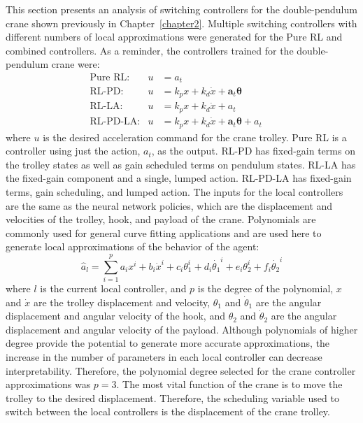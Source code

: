 This section presents an analysis of switching controllers for the double-pendulum crane shown previously in Chapter~\ref{chapter2}. Multiple switching controllers with different numbers of local approximations were generated for the Pure RL and combined controllers.
As a reminder, the controllers trained for the double-pendulum crane were:
%
\begin{align*}
&\qquad\qquad\text{Pure RL:} & u&=a_t \qquad\qquad\qquad\\
&\qquad\qquad\text{RL-PD:} & u&=k_px+k_d\dot{x} + \boldsymbol{a}_t\boldsymbol{\theta} \qquad\qquad\qquad\\
&\qquad\qquad\text{RL-LA:} & u&=k_px+k_d\dot{x} + a_t \qquad\qquad\qquad\\
&\qquad\qquad\text{RL-PD-LA:} & u&=k_px+k_d\dot{x} + \boldsymbol{a}_t\boldsymbol{\theta} + a_t \qquad\qquad\qquad
\end{align*}
%
where $u$ is the desired acceleration command for the crane trolley. Pure RL is a controller using just the action, $a_t$, as the output. RL-PD has fixed-gain terms on the trolley states as well as gain scheduled terms on pendulum states. RL-LA has the fixed-gain component and a single, lumped action. RL-PD-LA has fixed-gain terms, gain scheduling, and lumped action.
%
The inputs for the local controllers are the same as the neural network policies, which are the displacement and velocities of the trolley, hook, and payload of the crane.
Polynomials are commonly used for general curve fitting applications and are used here to generate local approximations of the behavior of the agent:
%
\begin{equation}
    \hat{a}_l=\sum_{i=1}^p a_ix^i + b_i\dot{x}^i + c_i\theta_1^i + d_i\dot{\theta_1}^i + e_i\theta_2^i + f_i\dot{\theta_2}^i
\label{eq_chap5:dpcrane_approx_func}
\end{equation}
%
where $l$ is the current local controller, and $p$ is the degree of the polynomial, $x$ and $\dot{x}$ are the trolley displacement and velocity, $\theta_1$ and $\dot{\theta}_1$ are the angular displacement and angular velocity of the hook, and $\theta_2$ and $\dot{\theta}_2$ are the angular displacement and angular velocity of the payload. Although polynomials of higher degree provide the potential to generate more accurate approximations, the increase in the number of parameters in each local controller can decrease interpretability. Therefore, the polynomial degree selected for the crane controller approximations was $p=3$.
%
The most vital function of the crane is to move the trolley to the desired displacement. Therefore, the scheduling variable used to switch between the local controllers is the displacement of the crane trolley.

